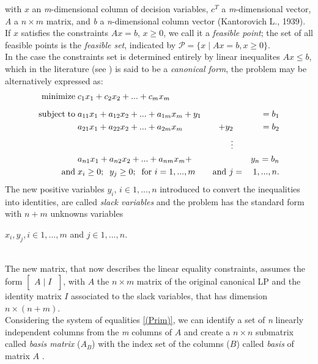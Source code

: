 \documentclass[a4paper,10 pt,titlepage,twoside]{book}
\theoremstyle{plain}
\theoremstyle{definition}
\theoremstyle{remark}
\begin{document}
with $x$ an \textit{m}-dimensional column  of decision variables, $c^
{T}$ a \textit{m}-dimensional vector, \textit{A} a $n \times m$ matrix, and \textit{b} a \textit{n}-dimensional column vector (Kantorovich L., 1939).\\
If $x$ satisfies the constraints $Ax = b$, $x\geq0$, we call it a \textit{feasible point}; the set of all feasible points is the \textit{feasible set}, indicated by $\mathcal{P}=\lbrace x\; |\; Ax = b , x \geq0\rbrace$.\\
In the case the constraints set is determined entirely by linear inequalites $Ax \leq b$, which in the literature (see \cite{W}) is said to be a \textit{canonical form}, the problem may be alternatively expressed as:
\begin{alignat*}{3}
\text{minimize\;}&c_1 x_1 + c_2 x_2+ ...+c_m x_m&&&\\[2mm]
\text{subject\;to\;}&a_{11} x_1 +a_{12}x_2 + ... +a_{1m}x_m +y_{1}&&&= b_1\\
		   	&a_{21}x_1+a_{22}x_2+ ... +a_{2m}x_m&+y_{2}&&= b_2\\
&&\;\;\;\vdots&&\\
&a_{n1}x_1+a_{n2}x_2+ ... +a_{nm}x_m+&&&y_{n}=b_n\\
\text{and} \;& x_{i} \geq 0;\;\; y_{j} \geq 0; \text{\;\;for }i = 1,...,m&\text{ and }j&=&1,...,n.
\end{alignat*}
The new positive variables $\mathit{y_{i}}$, $i \in {1, ..., n}$ introduced to convert the inequalities into identities, are called \textit{slack variables} and the problem has the standard form with $n+m$ unknowns variables \begin{itshape}$x_{i}, y_{j},i \in {1, ..., m}$ and $j \in {1, ..., n}.$\end{itshape}\\ The new matrix, that now describes the linear equality constraints, assumes the form $\left[\begin{matrix}A\;\vert\; I\;\end{matrix}\right]$, with $A$ the $n \times m$ matrix of the original canonical LP and the identity matrix $I$ associated to the slack variables, that has dimension $n \times (n + m)$.\\
Considering the system of equalities \ref{(Prim)}, we can identify a set of \textit{n} linearly independent columns from the \textit{m} columns of  $A$ and create a $n \times n$ submatrix called \textit{basis matrix} ($A_{B}$) with the index set of the columns ($B$) called \textit{basis} of matrix $A$ .\\
\end{document}

